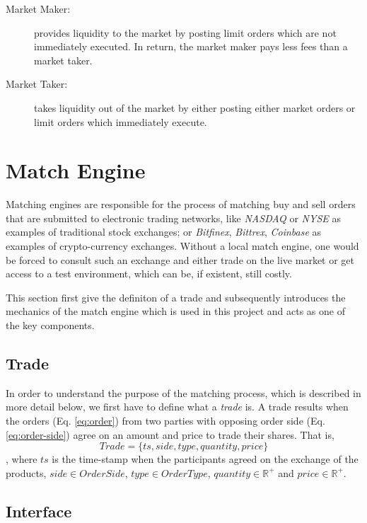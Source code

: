 \begin{description}
    \item[Market Maker:] provides liquidity to the market by posting limit orders which are not immediately executed.
    In return, the market maker pays less fees than a market taker.
    
    \item[Market Taker:] takes liquidity out of the market by either posting either market orders or limit orders which immediately execute.
\end{description}


\section{Match Engine}
\label{sec:match-engine}

Matching engines are responsible for the process of matching buy and sell orders that are submitted to electronic trading networks, like \textit{NASDAQ} or \textit{NYSE} as examples of traditional stock exchanges; or \textit{Bitfinex}, \textit{Bittrex}, \textit{Coinbase} as examples of crypto-currency exchanges.
Without a local match engine, one would be forced to consult such an exchange and either trade on the live market or get access to a test environment, which can be, if existent, still costly.

This section first give the definiton of a trade and subsequently introduces the mechanics of the match engine which is used in this project and acts as one of the key components.

\subsection{Trade}

In order to understand the purpose of the matching process, which is described in more detail below, we first have to define what a \textit{trade} is.
A trade results when the orders (Eq. \ref{eq:order}) from two parties with opposing order side (Eq. \ref{eq:order-side}) agree on an amount and price to trade their shares.
That is,
\begin{equation}\label{eq:trade}
    Trade=\{ ts, side, type, quantity, price \}
\end{equation}
, where $ts$ is the time-stamp when the participants agreed on the exchange of the products, $side \in OrderSide$, $type \in OrderType$, $quantity \in \mathbb{R^+}$ and $price \in \mathbb{R^+}$.

\subsection{Interface}
\label{sec:match-engine-interface}

